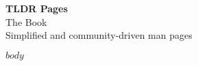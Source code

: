 \documentclass[
  12pt,    %
  DIV12,   %
  a4paper, %
  oneside, %
]{scrreprt}
\begin{document}
  \thispagestyle{plain}

  \begin{titlepage}
    \begin{center}
      \vspace*{11em}
      \huge{\textbf{TLDR Pages}}\\[1em]
      \LARGE{The Book}\\[3em]
      \large{Simplified and community-driven man pages}\\[1em]
    \end{center}
  \end{titlepage}

  \tableofcontents %

  $body$ %
\end{document}
